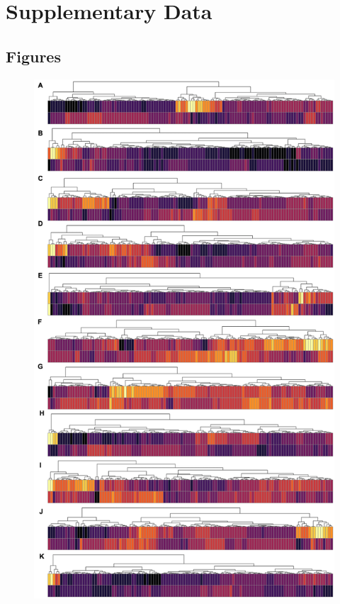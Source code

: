 \documentclass[10pt, letterpaper, twocolumn]{article}
\begin{document}


\clearpage

\onecolumn
\renewcommand{\thepage}{S\arabic{page}}
\renewcommand{\thesection}{S}
\renewcommand{\thetable}{S\arabic{table}}
\renewcommand{\thefigure}{S\arabic{figure}}
\setcounter{figure}{0}

\section{Supplementary Data}
\subsection{Figures}

\begin{figure}[!ht]
	\centering
	\includegraphics[height=0.8\textheight]{Figures/intra.png}


\end{figure}
\end{document}
